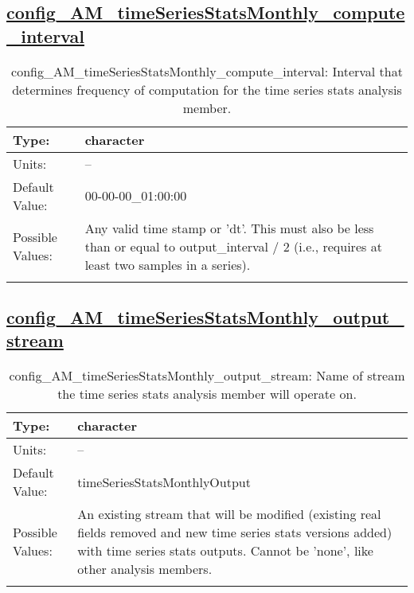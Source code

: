 \subsection[config\_AM\_timeSeriesStatsMonthly\_compute\_interval]{\hyperref[sec:nm_tab_AM_timeSeriesStatsMonthly]{config\_AM\_timeSeriesStatsMonthly\_compute\_interval}}
\label{subsec:nm_sec_config_AM_timeSeriesStatsMonthly_compute_interval}
\begin{center}
\begin{longtable}{| p{2.0in} || p{4.0in} |}
    \hline
    Type: & character \\
    \hline
    Units: & -- \\
    \hline
    Default Value: & 00-00-00\_01:00:00 \\
    \hline
    Possible Values: & Any valid time stamp or 'dt'. This must also be less than or equal to output\_interval / 2 (i.e., requires at least two samples in a series). \\
    \hline
    \caption{config\_AM\_timeSeriesStatsMonthly\_compute\_interval: Interval that determines frequency of computation for the time series stats analysis member.}
\end{longtable}
\end{center}
\subsection[config\_AM\_timeSeriesStatsMonthly\_output\_stream]{\hyperref[sec:nm_tab_AM_timeSeriesStatsMonthly]{config\_AM\_timeSeriesStatsMonthly\_output\_stream}}
\label{subsec:nm_sec_config_AM_timeSeriesStatsMonthly_output_stream}
\begin{center}
\begin{longtable}{| p{2.0in} || p{4.0in} |}
    \hline
    Type: & character \\
    \hline
    Units: & -- \\
    \hline
    Default Value: & timeSeriesStatsMonthlyOutput \\
    \hline
    Possible Values: & An existing stream that will be modified (existing real fields removed and new time series stats versions added) with time series stats outputs. Cannot be 'none', like other analysis members. \\
    \hline
    \caption{config\_AM\_timeSeriesStatsMonthly\_output\_stream: Name of stream the time series stats analysis member will operate on.}
\end{longtable}
\end{center}
